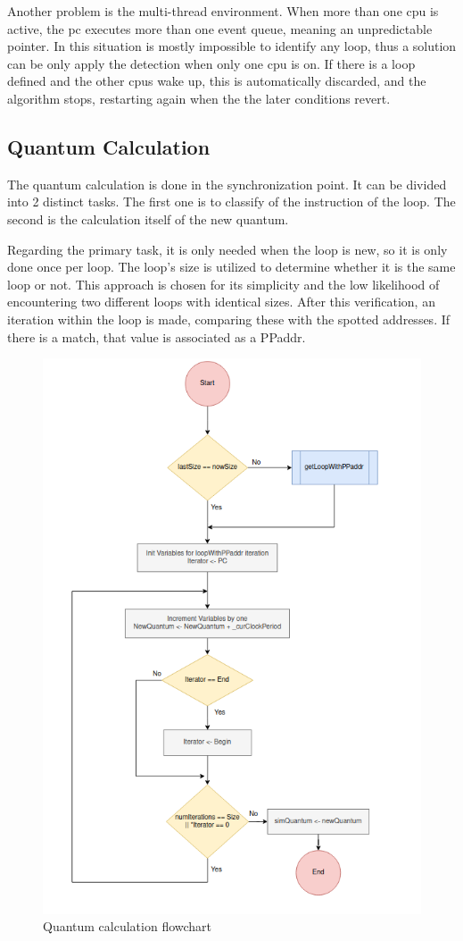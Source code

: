 Another problem is the multi-thread environment. When more than one \gls{cpu} is active, the \gls{pc} executes more than one event queue, meaning an unpredictable pointer. In this situation is mostly impossible to identify any loop, thus a solution can be only apply the detection when only one \gls{cpu} is on. If there is a loop defined and the other \glspl{cpu} wake up, this is automatically discarded, and the algorithm stops, restarting again when the the later conditions revert. 

\subsection{Quantum Calculation}

The quantum calculation is done in the synchronization point. It can be divided into 2 distinct tasks. The first one is to classify of the instruction of the loop. The second is the calculation itself of the new quantum. 

Regarding the primary task, it is only needed when the loop is new, so it is only done once per loop. The loop's size is utilized to determine whether it is the same loop or not. This approach is chosen for its simplicity and the low likelihood of encountering two different loops with identical sizes. After this verification, an iteration within the loop is made, comparing these with the spotted addresses. If there is a match, that value is associated as a PPaddr. 

\begin{figure}[H]
	\centering
 	\includegraphics[width=0.6\linewidth]{Images/Repetition_flowchart_quantum.png}
 	\caption{Quantum calculation flowchart}
	 \label{fig_Repetition_flowchart_quantum}
\end{figure}


